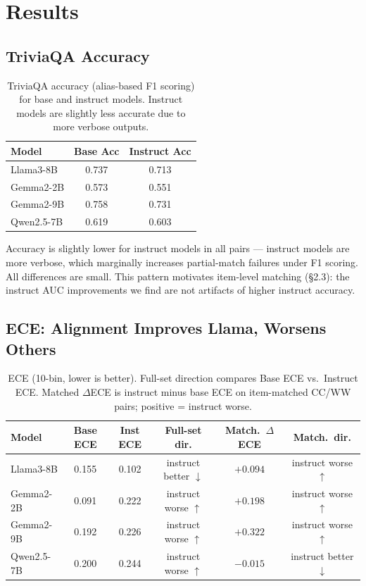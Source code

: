 \documentclass[11pt]{article}
\begin{document}
\section{Results}

\subsection{TriviaQA Accuracy}

\begin{table}[h]
\centering
\begin{tabular}{lcc}
\toprule
Model & Base Acc & Instruct Acc \\
\midrule
Llama3-8B  & 0.737 & 0.713 \\
Gemma2-2B  & 0.573 & 0.551 \\
Gemma2-9B  & 0.758 & 0.731 \\
Qwen2.5-7B & 0.619 & 0.603 \\
\bottomrule
\end{tabular}
\caption{TriviaQA accuracy (alias-based F1 scoring) for base and instruct models. Instruct models are slightly less accurate due to more verbose outputs.}
\label{tab:accuracy}
\end{table}

Accuracy is slightly lower for instruct models in all pairs --- instruct models are more verbose, which marginally increases partial-match failures under F1 scoring. All differences are small. This pattern motivates item-level matching (\S2.3): the instruct AUC improvements we find are not artifacts of higher instruct accuracy.

\subsection{ECE: Alignment Improves Llama, Worsens Others}

\begin{table}[h]
\centering
\small
\begin{tabular}{lccccc}
\toprule
Model & Base ECE & Inst ECE & Full-set dir. & Match.\ $\Delta$ECE & Match.\ dir. \\
\midrule
Llama3-8B  & 0.155 & 0.102 & instruct better $\downarrow$ & $+0.094$ & instruct worse $\uparrow$ \\
Gemma2-2B  & 0.091 & 0.222 & instruct worse $\uparrow$  & $+0.198$ & instruct worse $\uparrow$ \\
Gemma2-9B  & 0.192 & 0.226 & instruct worse $\uparrow$  & $+0.322$ & instruct worse $\uparrow$ \\
Qwen2.5-7B & 0.200 & 0.244 & instruct worse $\uparrow$  & $-0.015$ & instruct better $\downarrow$ \\
\bottomrule
\end{tabular}
\caption{ECE (10-bin, lower is better). Full-set direction compares Base ECE vs.\ Instruct ECE. Matched $\Delta$ECE is instruct minus base ECE on item-matched CC/WW pairs; positive = instruct worse.}
\label{tab:ece}
\end{table}
\end{document}
